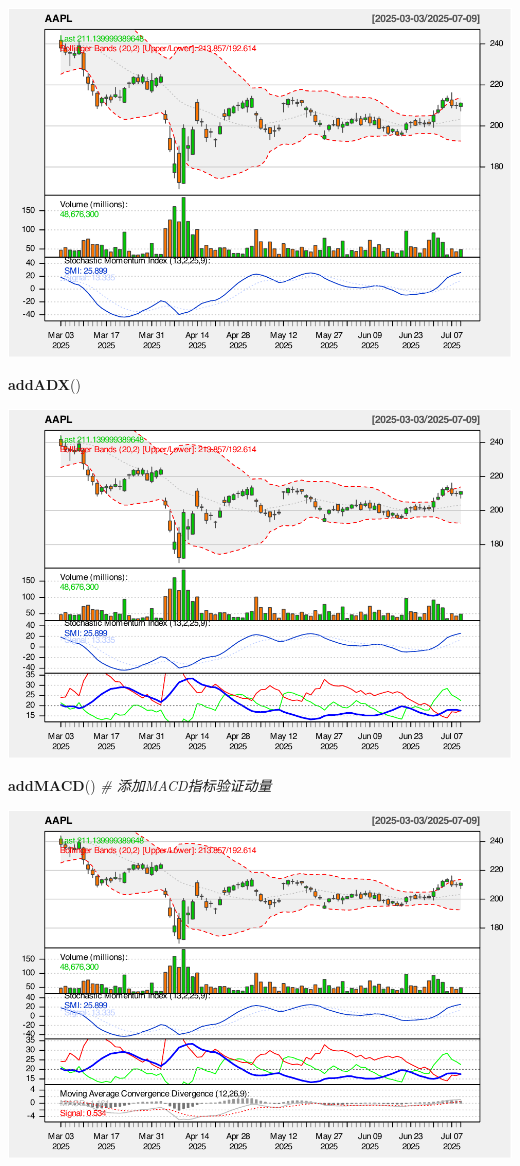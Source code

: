 \documentclass[]{ctexbook}
\newenvironment{Shaded}{\begin{snugshade}}{\end{snugshade}}
\newcommand{\CommentTok}[1]{\textcolor[rgb]{0.56,0.35,0.01}{\textit{#1}}}
\newcommand{\FunctionTok}[1]{\textcolor[rgb]{0.13,0.29,0.53}{\textbf{#1}}}
\newcommand{\NormalTok}[1]{#1}
\begin{document}
\includegraphics[width=0.9\linewidth]{quantmod_files/figure-latex/smi_2-3}

\begin{Shaded}
\begin{Highlighting}[]
\FunctionTok{addADX}\NormalTok{()}
\end{Highlighting}
\end{Shaded}

\includegraphics[width=0.9\linewidth]{quantmod_files/figure-latex/smi_2-4}

\begin{Shaded}
\begin{Highlighting}[]
\FunctionTok{addMACD}\NormalTok{()  }\CommentTok{\# 添加MACD指标验证动量}
\end{Highlighting}
\end{Shaded}

\includegraphics[width=0.9\linewidth]{quantmod_files/figure-latex/smi_2-5}
\end{document}
